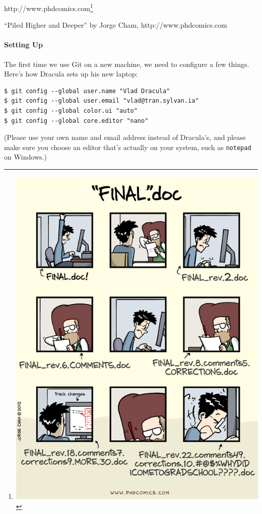\documentclass[]{book}
\newcommand{\urlfoot}[2]{{#1}\footnote{#2}}
\begin{document}
\urlfoot{http://www.phdcomics.com}{\includegraphics{novice/git/img/phd101212s.png}}

``Piled Higher and Deeper'' by Jorge Cham, http://www.phdcomics.com

\mbox{}\paragraph{Setting Up}

The first time we use Git on a new machine, we need to configure a few
things. Here's how Dracula sets up his new laptop:

\begin{verbatim}
$ git config --global user.name "Vlad Dracula"
$ git config --global user.email "vlad@tran.sylvan.ia"
$ git config --global color.ui "auto"
$ git config --global core.editor "nano"
\end{verbatim}

(Please use your own name and email address instead of Dracula's, and
please make sure you choose an editor that's actually on your system,
such as \texttt{notepad} on Windows.)
\end{document}
